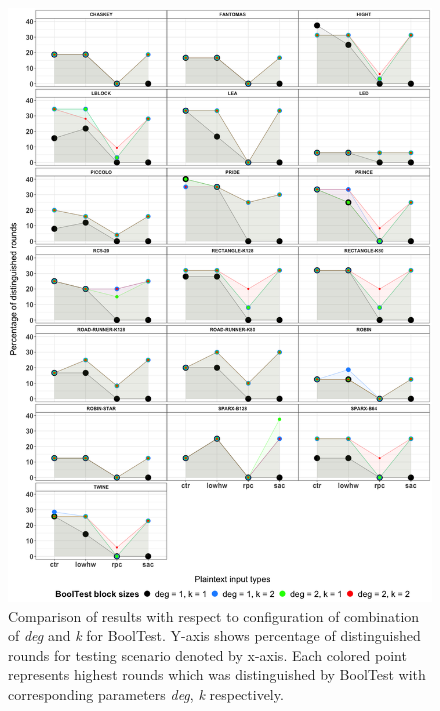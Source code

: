 \documentclass[
    digital,    %
    oneside,    %
    color,
    11pt,
    nocover,
    notable,
    nolof,
    nolot,
    final
]{fithesis3}
\renewcommand\_{\textunderscore\allowbreak}
\begin{document}
\begin{figure}[htp]
	\centering
	\includegraphics[width=\textwidth]{./images/pictures/bool_test_other_comparison_combinations.png}
	\caption{Comparison of results with respect to configuration of combination of \textit{deg} and \textit{k} for BoolTest. Y-axis shows percentage of distinguished rounds for testing scenario denoted by x-axis. Each colored point represents highest rounds which was distinguished by BoolTest with corresponding parameters \textit{deg}, \textit{k} respectively.}
	\label{fig:bool_test_other_comb}
\end{figure}
\end{document}
